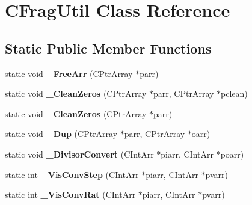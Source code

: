 \hypertarget{class_c_frag_util}{\section{C\-Frag\-Util Class Reference}
\label{class_c_frag_util}
}
\subsection*{Static Public Member Functions}
\begin{DoxyCompactItemize}
\item 
\hypertarget{class_c_frag_util_a41db7a80727625be5e0bbd66beeed83f}{static void {\bfseries \-\_\-\-Free\-Arr} (C\-Ptr\-Array $\ast$parr)}\label{class_c_frag_util_a41db7a80727625be5e0bbd66beeed83f}

\item 
\hypertarget{class_c_frag_util_a7de37dcbe093a9d12acd013278df22d2}{static void {\bfseries \-\_\-\-Clean\-Zeros} (C\-Ptr\-Array $\ast$parr, C\-Ptr\-Array $\ast$pclean)}\label{class_c_frag_util_a7de37dcbe093a9d12acd013278df22d2}

\item 
\hypertarget{class_c_frag_util_aa318fdcc9675d611151aac7f7df7253e}{static void {\bfseries \-\_\-\-Clean\-Zeros} (C\-Ptr\-Array $\ast$parr)}\label{class_c_frag_util_aa318fdcc9675d611151aac7f7df7253e}

\item 
\hypertarget{class_c_frag_util_aedc074c61ac3048658ae558f29998a69}{static void {\bfseries \-\_\-\-Dup} (C\-Ptr\-Array $\ast$parr, C\-Ptr\-Array $\ast$oarr)}\label{class_c_frag_util_aedc074c61ac3048658ae558f29998a69}

\item 
\hypertarget{class_c_frag_util_a72188d7480ea30c3aac78dbecf2e342c}{static void {\bfseries \-\_\-\-Divisor\-Convert} (C\-Int\-Arr $\ast$piarr, C\-Int\-Arr $\ast$poarr)}\label{class_c_frag_util_a72188d7480ea30c3aac78dbecf2e342c}

\item 
\hypertarget{class_c_frag_util_a7172aca3f52fe4b95ca0a7b991bc8808}{static int {\bfseries \-\_\-\-Vis\-Conv\-Step} (C\-Int\-Arr $\ast$piarr, C\-Int\-Arr $\ast$pvarr)}\label{class_c_frag_util_a7172aca3f52fe4b95ca0a7b991bc8808}

\item 
\hypertarget{class_c_frag_util_a818bba636efcef87ac912c72a8564361}{static int {\bfseries \-\_\-\-Vis\-Conv\-Rat} (C\-Int\-Arr $\ast$piarr, C\-Int\-Arr $\ast$pvarr)}\label{class_c_frag_util_a818bba636efcef87ac912c72a8564361}


\end{DoxyCompactItemize}
